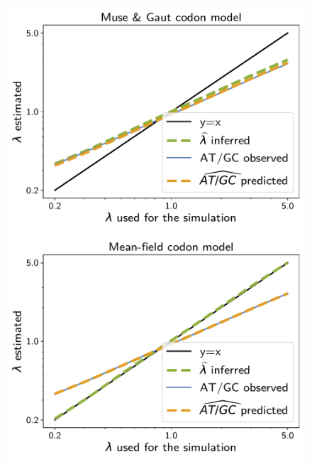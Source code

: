 \documentclass{article}
\begin{document}
\begin{figure}[!htb]
    \centering
    \begin{minipage}{0.325\linewidth}
        \includegraphics[width=\linewidth, page=1]{inference_supp_mat/PrimatesExons10Mu0.5_lambda_MG.pdf}
    \end{minipage}
    \hfill
    \begin{minipage}{0.325\linewidth}
        \includegraphics[width=\linewidth, page=1]{inference_supp_mat/PrimatesExons10Mu0.5_lambda_MF.pdf}
    \end{minipage}
    \hfill

\end{figure}
\end{document}
